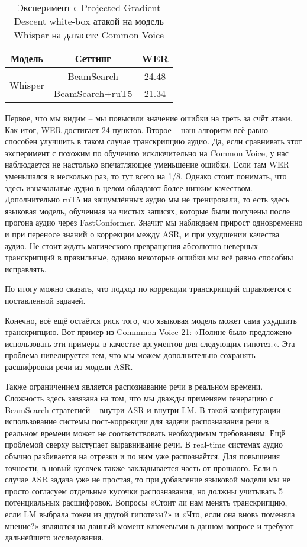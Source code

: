 \begin{table}[]
\centering
\caption{Эксперимент с Projected Gradient Descent white-box атакой на модель Whisper на датасете Common Voice}
\begin{tabular}{|c|c|c|}
\hline
Модель                         & Сеттинг                              & WER     \\ \hline
\multirow{2}{*}{Whisper}       & BeamSearch                           & 24.48   \\ \cline{2-3} 
                               & BeamSearch+ruT5                      & 21.34   \\ \hline
\end{tabular}
\label{tab:pgd}
\end{table}

Первое, что мы видим -- мы повысили значение ошибки на треть за счёт атаки.
Как итог, WER достигает 24 пунктов.
Второе -- наш алгоритм всё равно способен улучшить в таком случае транскрипцию аудио.
Да, если сравнивать этот эксперимент с похожим по обучению исключительно на Common Voice, у нас наблюдается не настолько впечатляющее уменьшение ошибки.
Если там WER уменьшался в несколько раз, то тут всего на 1/8.
Однако стоит понимать, что здесь изначальные аудио в целом обладают более низким качеством.
Дополнительно ruT5 на зашумлённых аудио мы не тренировали, то есть здесь языковая модель, обученная на чистых записях, которые были получены после прогона аудио через FastConformer.
Значит мы наблюдаем прирост одновременно и при переносе знаний о коррекции между ASR, и при ухудшении качества аудио.
Не стоит ждать магического превращения абсолютно неверных транскрипций в правильные, однако некоторые ошибки мы всё равно способны исправлять.

По итогу можно сказать, что подход по коррекции транскрипций справляется с поставленной задачей.

Конечно, всё ещё остаётся риск того, что языковая модель может сама ухудшить транскрипцию.
Вот пример из Commmon Voice 21: «Полине было предложено использовать эти примеры в качестве аргументов для следующих гипотез.».
Эта проблема нивелируется тем, что мы можем дополнительно сохранять расшифровки речи из модели ASR.

Также ограничением является распознавание речи в реальном времени.
Сложность здесь завязана на том, что мы дважды применяем генерацию с BeamSearch стратегией -- внутри ASR и внутри LM.
В такой конфигурации использование системы пост-коррекции для задачи распознавания речи в реальном времени может не соответствовать необходимым требованиям.
Ещё проблемой сверху выступает выравнивание речи.
В real-time системах аудио обычно разбивается на отрезки и по ним уже распознаётся.
Для повышения точности, в новый кусочек также закладывается часть от прошлого.
Если в случае ASR задача уже не простая, то при добавление языковой модели мы не просто согласуем отдельные кусочки распознавания, но должны учитывать 5 потенциальных расшифровок.
Вопросы «Стоит ли нам менять транскрипцию, если LM выбрала токен из другой гипотезы?» и «Что, если она вновь поменяла мнение?» являются на данный момент ключевыми в данном вопросе и требуют дальнейшего исследования.

